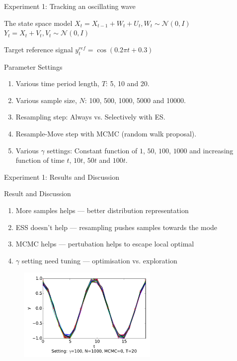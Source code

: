 \documentclass[handout]{beamer}
\begin{document}
\begin{frame}{Experiment 1: Tracking an oscillating wave}
\begin{block}{The state space model}
  $X_t = X_{t-1} + W_t + U_t, W_t \sim \mathcal{N}(0,I)$
  $Y_t = X_t + V_t, V_t \sim \mathcal{N}(0,I)$
\end{block}

\begin{block}{Target reference signal}
$y^{ref}_t = \cos(0.2 \pi t + 0.3)$ 
\end{block}

\begin{block}{Parameter Settings}
\begin{enumerate}
\item Various time period length, $T$: 5, 10 and 20.
\item Various sample size, $N$: 100, 500, 1000, 5000 and 10000.
\item Resampling step: Always vs. Selectively with ES.
\item Resample-Move step with MCMC (random walk proposal).
\item Various $\gamma$ settings: Constant function of $1$, $50$, $100$, $1000$ and increasing function of time $t$, $10t$, $50t$ and $100t$.
\end{enumerate}
\end{block}
\end{frame}

\begin{frame}{Experiment 1: Results and Discussion}
\begin{block}{Result and Discussion}
\begin{enumerate}
\item More samples helps --- better distribution representation
\item ESS doesn't help --- resampling pushes samples towards the mode
\item MCMC helps --- pertubation helps to escape local optimal
\item $\gamma$ setting need tuning --- optimisation vs. exploration
\end{enumerate}
\end{block}

  \begin{figure}
    \centering
    \includegraphics[width = 0.6\textwidth]{figure/output_y/output_20_100.pdf}
  \end{figure}
\end{frame}
\end{document}
